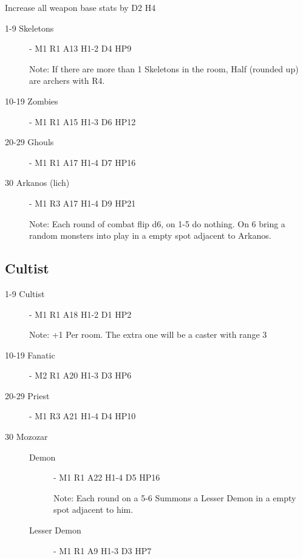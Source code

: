 \documentclass[a6paper,hidelinks]{article}
\begin{document}
Increase all weapon base stats by D2 H4

\begin{description}

\item[1-9 Skeletons] - M1 R1 A13 H1-2 D4 HP9

Note: If there are more than 1 Skeletons in the room, Half (rounded up) are archers with R4.

\item[10-19 Zombies] - M1 R1 A15 H1-3 D6 HP12

\item[20-29 Ghouls] - M1 R1 A17 H1-4 D7 HP16

\item[30 Arkanos (lich)] - M1 R3 A17 H1-4 D9 HP21

Note: Each round of combat flip d6, on 1-5 do nothing. On 6 bring a random monsters into play in a empty spot adjacent to Arkanos.

\end{description}

\subsection{Cultist}

\begin{description}

\item[1-9 Cultist] - M1 R1 A18 H1-2 D1 HP2

Note: +1 Per room. The extra one will be a caster with range 3

\item[10-19 Fanatic] - M2 R1 A20 H1-3 D3 HP6

\item[20-29 Priest] - M1 R3 A21 H1-4 D4 HP10

\item[30 Mozozar] \hspace{1cm}

\begin{description}

\item[Demon] - M1 R1 A22 H1-4 D5 HP16

Note: Each round on a 5-6 Summons a Lesser Demon in a empty spot adjacent to him.
\item[Lesser Demon] - M1 R1 A9 H1-3 D3 HP7

\end{description}

\end{description}

\end{document}
